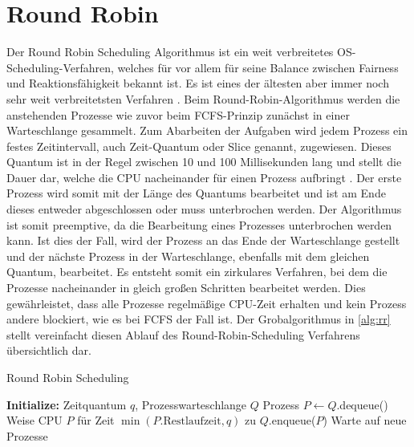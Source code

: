 
\section{Round Robin}

Der Round Robin Scheduling Algorithmus ist ein weit verbreitetes OS-Scheduling-Verfahren, welches für vor allem für seine Balance zwischen Fairness und Reaktionsfähigkeit bekannt ist. Es ist eines der ältesten aber immer noch sehr weit verbreitetsten Verfahren \cite[S.158]{Tanenbaum.2024}.  
Beim Round-Robin-Algorithmus werden die anstehenden Prozesse wie zuvor beim \ac{FCFS}-Prinzip zunächst in einer Warteschlange gesammelt. Zum Abarbeiten der Aufgaben wird jedem Prozess ein festes Zeitintervall, auch Zeit-Quantum oder Slice genannt, zugewiesen. Dieses Quantum ist in der Regel zwischen 10 und 100 Millisekunden lang und stellt die Dauer dar, welche die CPU nacheinander für einen Prozess aufbringt \cite[S.209]{Silberschatz.2019}. Der erste Prozess wird somit mit der Länge des Quantums bearbeitet und ist am Ende dieses entweder abgeschlossen oder muss unterbrochen werden. Der Algorithmus ist somit preemptive, da die Bearbeitung eines Prozesses unterbrochen werden kann. Ist dies der Fall, wird der Prozess an das Ende der Warteschlange gestellt und der nächste Prozess in der Warteschlange, ebenfalls mit dem gleichen Quantum, bearbeitet. Es entsteht somit ein zirkulares Verfahren, bei dem die Prozesse nacheinander in gleich großen Schritten bearbeitet werden. Dies gewährleistet, dass alle Prozesse regelmäßige \ac{CPU}-Zeit erhalten und kein Prozess andere blockiert, wie es bei \ac{FCFS} der Fall ist. Der Grobalgorithmus in \ref{alg:rr} stellt vereinfacht diesen Ablauf des Round-Robin-Scheduling Verfahrens übersichtlich dar.

\begin{algorithm} 
\caption{Round Robin Scheduling} \label{alg:rr}
\begin{algorithmic}[1]
	\State \textbf{Initialize:} Zeitquantum $q$, Prozesswarteschlange $Q$
	\State Prozess $P \gets Q$.dequeue()
	\State Weise CPU $P$ für Zeit $\min(P.\text{Restlaufzeit}, q)$ zu
	\State $Q$.enqueue($P$) 
	\EndIf
	\State Warte auf neue Prozesse
	\EndIf
	\EndWhile
\end{algorithmic}
\end{algorithm}

